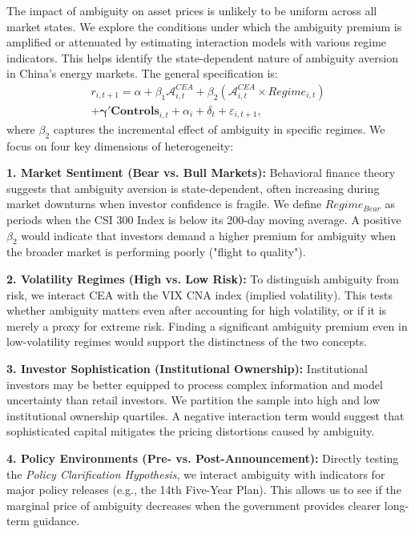 \documentclass[preprint,12pt,authoryear]{elsarticle}
\begin{document}
The impact of ambiguity on asset prices is unlikely to be uniform across all market states. We explore the conditions under which the ambiguity premium is amplified or attenuated by estimating interaction models with various regime indicators. This helps identify the state-dependent nature of ambiguity aversion in China's energy markets. The general specification is:
\begin{equation}
\begin{split}
r_{i,t+1} = \alpha + \beta_1 \mathcal{A}^{CEA}_{i,t} + \beta_2 (\mathcal{A}^{CEA}_{i,t} \times Regime_{i,t}) \\
+ \boldsymbol{\gamma}'\mathbf{Controls}_{i,t} + \alpha_i + \delta_t + \varepsilon_{i,t+1},
\end{split}
\end{equation}
where $\beta_2$ captures the incremental effect of ambiguity in specific regimes. We focus on four key dimensions of heterogeneity:

\textbf{1. Market Sentiment (Bear vs. Bull Markets):} Behavioral finance theory suggests that ambiguity aversion is state-dependent, often increasing during market downturns when investor confidence is fragile. We define $Regime_{Bear}$ as periods when the CSI 300 Index is below its 200-day moving average. A positive $\beta_2$ would indicate that investors demand a higher premium for ambiguity when the broader market is performing poorly ("flight to quality").

\textbf{2. Volatility Regimes (High vs. Low Risk):} To distinguish ambiguity from risk, we interact CEA with the VIX CNA index (implied volatility). This tests whether ambiguity matters even after accounting for high volatility, or if it is merely a proxy for extreme risk. Finding a significant ambiguity premium even in low-volatility regimes would support the distinctness of the two concepts.

\textbf{3. Investor Sophistication (Institutional Ownership):} Institutional investors may be better equipped to process complex information and model uncertainty than retail investors. We partition the sample into high and low institutional ownership quartiles. A negative interaction term would suggest that sophisticated capital mitigates the pricing distortions caused by ambiguity.

\textbf{4. Policy Environments (Pre- vs. Post-Announcement):} Directly testing the \textit{Policy Clarification Hypothesis}, we interact ambiguity with indicators for major policy releases (e.g., the 14th Five-Year Plan). This allows us to see if the marginal price of ambiguity decreases when the government provides clearer long-term guidance.
\end{document}
